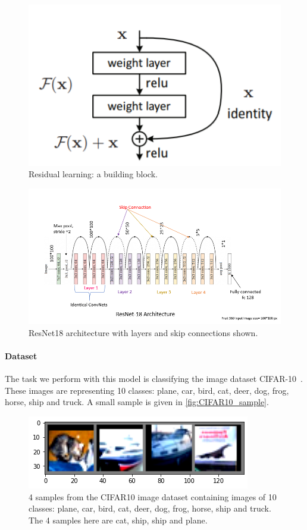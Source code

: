 \documentclass[a4paper,11pt,oneside]{report}
\begin{document}
\begin{figure}
    \centering
    \includegraphics[scale=1]{midterm presentation/images/building_block_ResNet.png}
    \caption{Residual learning: a building block.}
    \label{fig:building_block_resnet}
\end{figure}

\begin{figure}
    \centering
    \includegraphics[scale=0.35]{midterm presentation/images/ResNet18.png}
    \caption{ResNet18 architecture with layers and skip connections shown.}
    \label{fig:resnet18}
\end{figure}

\paragraph{Dataset}
The task we perform with this model is classifying the image dataset CIFAR-10~\citep{Krizhevsky09learningmultiple}. These images are representing 10 classes: plane, car, bird, cat, deer, dog, frog, horse, ship and truck. A small sample is given in \autoref{fig:CIFAR10_sample}.

\begin{figure}
    \centering
    \includegraphics{figures/CIFAR10_sample.png}
    \caption{4 samples from the CIFAR10 image dataset containing images of 10 classes: plane, car, bird, cat, deer, dog, frog, horse, ship and truck. The 4 samples here are cat, ship, ship and plane.}
    \label{fig:CIFAR10_sample}
\end{figure}
\end{document}

